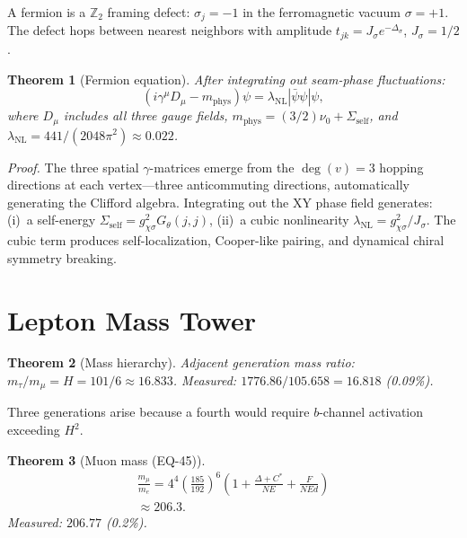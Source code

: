 \documentclass[11pt,twocolumn]{article}
\newtheorem{theorem}{Theorem}
\begin{document}
A fermion is a $\mathbb{Z}_2$ framing defect: $\sigma_j=-1$ in the ferromagnetic vacuum $\sigma=+1$.
The defect hops between nearest neighbors with amplitude $t_{jk}=J_\sigma e^{-\Delta_\sigma}$, $J_\sigma=1/2$.

\begin{theorem}[Fermion equation]
\label{thm:fermion}
After integrating out seam-phase fluctuations:
\begin{equation}
(i\gamma^\mu D_\mu-m_{\mathrm{phys}})\psi=\lambda_{\mathrm{NL}}|\bar\psi\psi|\psi,
\label{eq:fermion}
\end{equation}
where $D_\mu$ includes all three gauge fields, $m_{\mathrm{phys}}=(3/2)\nu_0+\Sigma_{\mathrm{self}}$, and $\lambda_{\mathrm{NL}}=441/(2048\pi^2)\approx 0.022$.
\end{theorem}

\textit{Proof.}
The three spatial $\gamma$-matrices emerge from the $\deg(v)=3$ hopping directions at each vertex---three anticommuting directions, automatically generating the Clifford algebra.
Integrating out the XY phase field generates: (i)~a self-energy $\Sigma_{\mathrm{self}}=g_{\chi\sigma}^2 G_\theta(j,j)$, (ii)~a cubic nonlinearity $\lambda_{\mathrm{NL}}=g_{\chi\sigma}^2/J_\sigma$.
The cubic term produces self-localization, Cooper-like pairing, and dynamical chiral symmetry breaking.

\section{Lepton Mass Tower}
\label{sec:lepton}

\begin{theorem}[Mass hierarchy]
\label{thm:masshier}
Adjacent generation mass ratio: $m_{\tau}/m_\mu=H=101/6\approx 16.833$.
Measured: $1776.86/105.658=16.818$ (0.09\%).
\end{theorem}

Three generations arise because a fourth would require $b$-channel activation exceeding $H^2$.

\begin{theorem}[Muon mass (EQ-45)]
\label{thm:muon}
\begin{multline}
\frac{m_\mu}{m_e}=4^4\left(\frac{185}{192}\right)^{\!6}\!\left(1+\frac{\Delta{+}C^*}{NE}+\frac{F}{NEd}\right)\\
\approx 206.3.
\label{eq:muon}
\end{multline}
Measured: $206.77$ (0.2\%).
\end{theorem}
\end{document}

